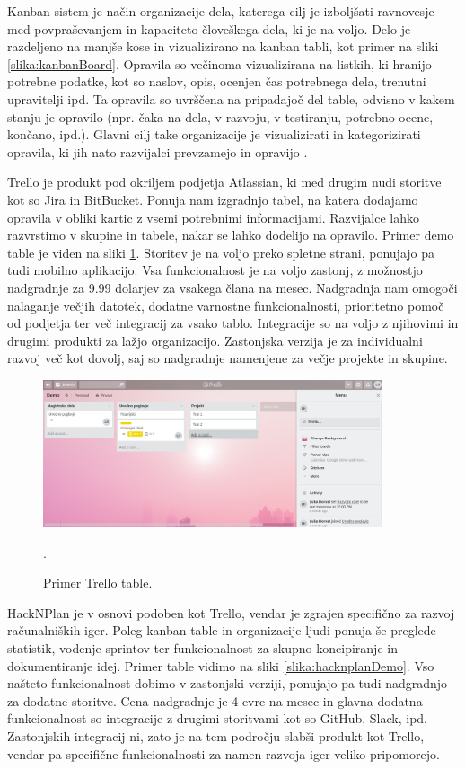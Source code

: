 \documentclass[12pt,a4paper,twoside]{book}
\begin{document}
Kanban sistem je način organizacije dela, katerega cilj je izboljšati ravnovesje med povpraševanjem in kapaciteto človeškega dela, ki je na voljo. Delo je razdeljeno na manjše kose in vizualizirano na kanban tabli, kot primer na sliki \ref{slika:kanbanBoard}. Opravila so večinoma vizualizirana na listkih, ki hranijo potrebne podatke, kot so naslov, opis, ocenjen čas potrebnega dela, trenutni upravitelji ipd. Ta opravila so uvrščena na pripadajoč del table, odvisno v kakem stanju je opravilo (npr. čaka na dela, v razvoju, v testiranju, potrebno ocene, končano, ipd.). Glavni cilj take organizacije je vizualizirati in kategorizirati opravila, ki jih nato razvijalci prevzamejo in opravijo \cite{kanbanBoard}.

Trello je produkt pod okriljem podjetja Atlassian, ki med drugim nudi storitve kot so Jira in BitBucket. Ponuja nam izgradnjo tabel, na katera dodajamo opravila v obliki kartic z vsemi potrebnimi informacijami. Razvijalce lahko razvrstimo v skupine in tabele, nakar se lahko dodelijo na opravilo. Primer demo table je viden na sliki \ref{slika:trelloDemo}. Storitev je na voljo preko spletne strani, ponujajo pa tudi mobilno aplikacijo. Vsa funkcionalnost je na voljo zastonj, z možnostjo nadgradnje za 9.99 dolarjev za vsakega člana na mesec. Nadgradnja nam omogoči nalaganje večjih datotek, dodatne varnostne funkcionalnosti, prioritetno pomoč od podjetja ter več integracij za vsako tablo. Integracije so na voljo z njihovimi in drugimi produkti za lažjo organizacijo. Zastonjska verzija je za individualni razvoj več kot dovolj, saj so nadgradnje namenjene za večje projekte in skupine.

\begin{figure}[h]
	\centering
	\includegraphics[width=10cm]{trelloBoardDemo}
	\caption{Primer Trello table.}.
	\label{slika:trelloDemo}
	\vspace*{-2em}
\end{figure}

HackNPlan je v osnovi podoben kot Trello, vendar je zgrajen specifično za razvoj računalniških iger. Poleg kanban table in organizacije ljudi ponuja še preglede statistik, vodenje sprintov ter funkcionalnost za skupno koncipiranje in dokumentiranje idej. Primer table vidimo na sliki \ref{slika:hacknplanDemo}. Vso našteto funkcionalnost dobimo v zastonjski verziji, ponujajo pa tudi nadgradnjo za dodatne storitve. Cena nadgradnje je 4 evre na mesec in glavna dodatna funkcionalnost so integracije z drugimi storitvami kot so GitHub, Slack, ipd. Zastonjskih integracij ni, zato je na tem področju slabši produkt kot Trello, vendar pa specifične funkcionalnosti za namen razvoja iger veliko pripomorejo.
\end{document}
